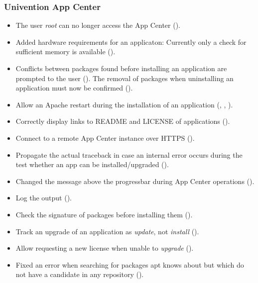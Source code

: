 \subsubsection{Univention App Center}
\begin{itemize}
\item The user \emph{root} can no longer access the App Center ().
\item Added hardware requirements for an applicaton: Currently only a check
  for sufficient memory is available ().
\item Conflicts between packages found before installing an application are
  prompted to the user (). The removal of packages when
  uninstalling an application must now be confirmed ().
\item Allow an Apache restart during the installation of an application
  (, , ).
\item Correctly display links to README and LICENSE of applications
  ().
\item Connect to a remote App Center instance over HTTPS ().
\item Propagate the actual traceback in case an internal error occurs during the
  test whether an app can be installed/upgraded ().
\item Changed the message above the progressbar during App Center operations
  ().
\item Log the  output ().
\item Check the signature of packages before installing them ().
\item Track an upgrade of an application as \emph{update}, not \emph{install} ().
\item Allow requesting a new license when unable to \emph{upgrade} ().
\item Fixed an error when searching for packages apt knows about but which do
  not have a candidate in any repository ().

\end{itemize}
